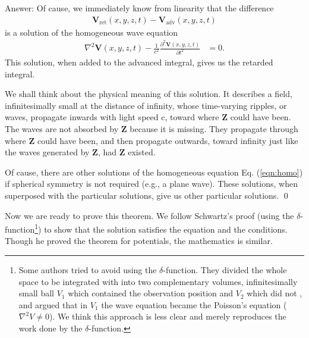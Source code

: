 \documentclass[11pt]{article}              %
\begin{document}
Answer: Of cause, we immediately know from linearity \cite{podolsky1969fundamentals} that the difference
\begin{align}
{\mathbf V}_{\mbox{ret}}(x,y,z,t)-{\mathbf V}_{\mbox{adv}}(x,y,z,t) \label{eqn:homosolution}
\end{align}
is a solution of the homogeneous wave equation
\begin{align}
	\nabla^2 {\mathbf V}(x,y,z,t) -\frac{1}{c^2}\frac{\partial^2 {\mathbf V}(x,y,z,t)}{\partial t^2}&=0.\label{eqn:homo}
\end{align}
This solution, when added to the advanced integral, gives us the retarded integral.

We shall think about the physical meaning of this solution. It describes a field, infinitesimally small at the distance of infinity, whose time-varying ripples, or waves, propagate inwards with light speed c, toward where  ${\mathbf Z}$ could have been. The waves are not absorbed by ${\mathbf Z}$ because it is missing. They propagate through where ${\mathbf Z}$ could have been, and then propagate outwards, toward infinity just like the waves generated by ${\mathbf Z}$, had ${\mathbf Z}$ existed. 

Of cause, there are other solutions of the homogeneous equation Eq. (\ref{eqn:homo}) if spherical symmetry is not required (e.g., a plane wave). These solutions, when superposed with the particular solutions, give us other particular solutions.
\qed

Now we are ready to prove this theorem. We follow Schwartz's proof \cite{schwartz1972principles} (using the $\delta$-function\footnote{Some authors tried to avoid using the $\delta$-function. They divided the whole space to be integrated with into two complementary volumes, infinitesimally small ball $V_1$ which contained the observation position and $V_2$ which did not 
\cite{becker1982electromagnetic} \cite{heald1995classical} \cite{jefimenko2004electromagnetic} \cite{steane2012relativity}, and argued that in $V_1$ the wave equation became the Poisson's equation ($\nabla^2 V \neq 0$). We think this approach is less clear and merely reproduces the work done by the $\delta$-function.}) to show that the solution satisfies the equation and the conditions. Though he proved the theorem for potentials, the mathematics is similar.
\end{document}
